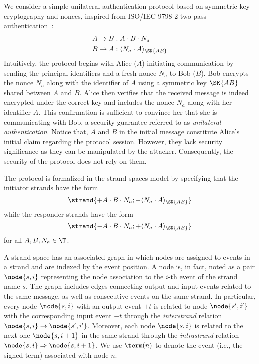  \begin{example}
  \label{ex:simpleprotocol}
  We consider a simple unilateral authentication protocol based on symmetric key cryptography and nonces, inspired from
  ISO/IEC 9798-2 two-pass authentication~\cite{ISO97982}:
  \begin{align*}
    A \rightarrow B & : A \cdot B \cdot N_a \\
    B \rightarrow A & : \enc{N_a \cdot A}{ \SK{AB}}
  \end{align*}
Intuitively, the protocol begins with Alice ($A$) initiating communication by sending the principal identifiers and a fresh nonce $N_a$ to Bob ($B$). Bob encrypts the nonce $N_a$ along with the identifier of $A$ using a  symmetric key $\SK{AB}$ shared between $A$ and $B$. Alice then verifies that the received message is indeed encrypted under the correct key and includes the nonce $N_a$ along with her identifier $A$. This confirmation is sufficient to convince her that she is communicating with Bob, a security guarantee referred to as \emph{unilateral authentication}.
Notice that, $A$ and $B$ in the initial message constitute Alice's initial claim regarding the protocol session. However, they lack security significance as they can be manipulated by the attacker. Consequently, the security of the protocol does not rely on them.


The protocol is formalized in the strand spaces model by specifying that
the initiator strands have the form
\[ \strand{ + A \cdot B \cdot N_a; - \enc{N_a \cdot A}{ \SK{AB}} } \]
while the responder strands have the form
\[ \strand{ - A \cdot B \cdot N_a; + \enc{N_a \cdot A}{ \SK{AB}} } \]
for all $A, B, N_a \in \T$.
\end{example}
A strand space has an associated graph in which nodes are assigned to events in a strand and are indexed by the event position. A node is, in fact, noted as a pair $\node{ s, i }$ representing the node association to the $i$-th event of the strand name $s$. The graph includes edges connecting output and input events related to the same message, as well as consecutive events on the same strand. In particular, every node $\node{ s, i }$ with an output event $+t$ is related to node $\node{ s', i' }$ with the corresponding input event $-t$ through the \emph{interstrand} relation $\node{ s, i } \rightarrow \node{ s', i' }$. Moreover, each node $\node{ s, i }$ is related to the next one $\node{ s, i+1 }$ in the same strand through the \emph{intrastrand} relation $\node{ s, i } \Rightarrow \node{ s, i+1 }$. We use $\term(n)$ to denote the event (i.e., the signed term) associated with node $n$.

